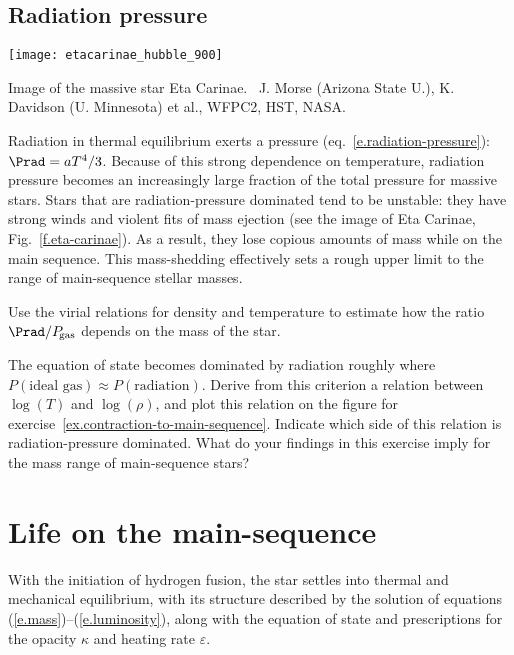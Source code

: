 \subsection{Radiation pressure}
\label{s.radiation-pressure}

\begin{marginfigure}
\texttt{[image: etacarinae\_hubble\_900]}
\caption[Image of the massive star Eta Carinae]{\label{f.eta-carinae} Image of the massive star Eta Carinae. \imgcred\ J. Morse (Arizona State U.), K. Davidson (U. Minnesota) et al., WFPC2, HST, NASA.}
\end{marginfigure}
Radiation in thermal equilibrium exerts a pressure (eq.~\ref{e.radiation-pressure}): $\Prad = aT^{4}/3$. Because of this strong dependence on temperature, radiation pressure becomes an increasingly large fraction of the total pressure for massive stars. Stars that are radiation-pressure dominated tend to be unstable: they have strong winds and violent fits of mass ejection (see the image of Eta Carinae, Fig.~\ref{f.eta-carinae}). As a result, they lose copious amounts of mass while on the main sequence. This mass-shedding effectively sets a rough upper limit to the range of main-sequence stellar masses.

\begin{exercisebox}
Use the virial relations for density and temperature to estimate how the ratio $\Prad/P_{\!\mathrm{gas}}$ depends on the mass of the star.
\end{exercisebox}

\begin{exercisebox}
\label{ex.maximum-stellar-mass}
The equation of state becomes dominated by radiation roughly where $P(\textrm{ideal gas}) \approx P(\textrm{radiation})$. Derive from this criterion a relation between $\log(T)$ and $\log(\rho)$, and plot this relation on the figure for exercise~\ref{ex.contraction-to-main-sequence}. Indicate which side of this relation is radiation-pressure dominated. What do your findings in this exercise imply for the mass range of main-sequence stars?
\end{exercisebox}

\section{Life on the main-sequence}

With the initiation of hydrogen fusion, the star settles into thermal and mechanical equilibrium, with its structure described by the solution of equations (\ref{e.mass})--(\ref{e.luminosity}), along with the equation of state and prescriptions for the opacity $\kappa$ and heating rate $\varepsilon$. 

